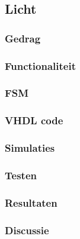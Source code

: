 \subsection{Licht}

\subsubsection{Gedrag}

\subsubsection{Functionaliteit}

\subsubsection{FSM}

\subsubsection{VHDL code}

\subsubsection{Simulaties}

\subsubsection{Testen}

\subsubsection{Resultaten}

\subsubsection{Discussie}

